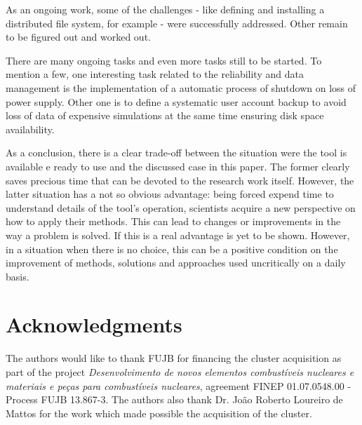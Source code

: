 \documentclass[twoside,a4paper,12pt,english]{inac17}
\begin{document}
As an ongoing work, some of the challenges - like defining and installing a distributed file system, for example - were successfully
addressed. Other remain to be figured out and worked out.

There are many ongoing tasks and even more tasks still to be started. To mention a few, one
interesting task related to the reliability and data management is the implementation of
a automatic process of shutdown on loss of power supply. Other one is to define a systematic
user account backup to avoid loss of data of expensive simulations at the same time ensuring
disk space availability.

As a conclusion, there is a clear trade-off between the situation were the tool is available e ready to use and the discussed case in this paper.
The former clearly saves precious time that can be devoted to the research work itself. However, the latter situation has a not so obvious
advantage: being forced expend time to understand details of the tool's operation, scientists acquire a new perspective on how to apply their
methods. This can lead to changes or improvements in the way a problem is solved. If this is a real advantage is yet to be shown. However,
in a situation when there is no choice, this can be a positive condition on the improvement of methods, solutions and approaches used
uncritically on a daily basis.







\section*{Acknowledgments}
The authors would like to thank FUJB for financing the cluster acquisition
as part of the project \textit{Desenvolvimento de novos elementos combust\'{i}veis nucleares
  e materiais e pe\c{c}as para combust\'{i}veis nucleares}, agreement FINEP 01.07.0548.00 - Process FUJB 13.867-3.
The authors also thank Dr. Jo\~{a}o Roberto Loureiro de Mattos for the work which made possible the acquisition
of the cluster.

\end{document}
